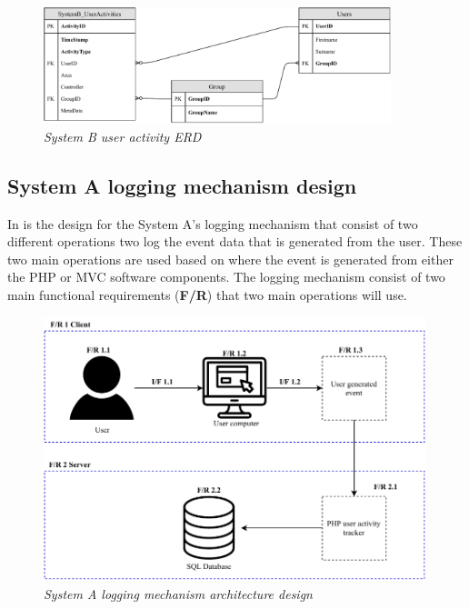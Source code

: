 \begin{figure}[!htb] %
	\centering %
	\includegraphics[width=0.9\textwidth]{Images/Chapter2/SystemB_ERD_Basic/SystemB_ERD_Basic.pdf}
	\caption[System B user activity ERD]
	{\textit{System B user activity ERD}}\label{fig:ch2_SystemB_Basic_ERD}
\end{figure}

\clearpage

\subsection{System A logging mechanism design}

In  is the design for the System A's logging mechanism that consist of two different operations two log the event data that is generated from the user. These two main operations are used based on where the event is generated from either the PHP or MVC software components. The logging mechanism consist of two main functional requirements (\textbf{F/R}) that two main operations will use.

\begin{figure}[!htb] %
	\centering %
	\includegraphics[width=0.99\textwidth]{Images/Chapter2/SystemA_Architecture_Diagram/SystemA_Architecture_Diagram.pdf}
	\caption[System A logging mechanism architecture design]
	{\textit{System A logging mechanism architecture design}}\label{fig:ch2_SystemA_Arch_Design}
\end{figure}

